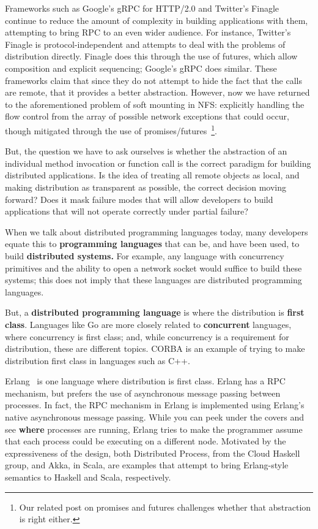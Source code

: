 Frameworks such as Google's gRPC for HTTP/2.0 and Twitter's Finagle continue to reduce the amount of complexity in building applications with them, attempting to bring RPC to an even wider audience.  For instance, Twitter's Finagle is protocol-independent and attempts to deal with the problems of distribution directly.  Finagle does this through the use of futures, which allow composition and explicit sequencing; Google's gRPC does similar.  These frameworks claim that since they do not attempt to hide the fact that the calls are remote, that it provides a better abstraction.  However, now we have returned to the aforementioned problem of soft mounting in NFS: explicitly handling the flow control from the array of possible network exceptions that could occur, though mitigated through the use of promises/futures~\footnote{Our related post on promises and futures challenges whether that abstraction is right either.}.

But, the question we have to ask ourselves is whether the abstraction of an individual method invocation or function call is the correct paradigm for building distributed applications.  Is the idea of treating all remote objects as local, and making distribution as transparent as possible, the correct decision moving forward?  Does it mask failure modes that will allow developers to build applications that will not operate correctly under partial failure?

When we talk about distributed programming languages today, many developers equate this to \textbf{programming languages} that can be, and have been used, to build \textbf{distributed systems.}  For example, any language with concurrency primitives and the ability to open a network socket would suffice to build these systems; this does not imply that these languages are distributed programming languages.

But, a \textbf{distributed programming language} is where the  distribution is \textbf{first class}.  Languages like Go are more closely related to \textbf{concurrent} languages, where concurrency is first class; and, while concurrency is a requirement for distribution, these are different topics.  CORBA is an example of trying to make distribution first class in languages such as C++.

Erlang~\cite{claessen2005semantics, svensson2007more, svensson2007programming} is one language where distribution is first class.  Erlang has a RPC mechanism, but prefers the use of asynchronous message passing between processes.  In fact, the RPC mechanism in Erlang is implemented using Erlang's native asynchronous message passing.  While you can peek under the covers and see \textbf{where} processes are running, Erlang tries to make the programmer assume that each process could be executing on a different node.  Motivated by the expressiveness of the design, both Distributed Process, from the Cloud Haskell group, and Akka, in Scala, are examples that attempt to bring Erlang-style semantics to Haskell and Scala, respectively.

